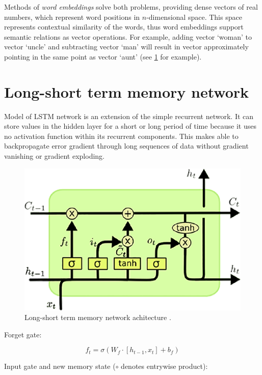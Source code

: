 Methods of \emph{word embeddings} solve both problems, providing dense vectors of real numbers, which represent word positions in $n$-dimensional space. This space represents contextual similarity of the words, thus word embeddings support semantic relations as vector operations. For example, adding vector ‘woman’ to vector ‘uncle’ and subtracting vector ‘man’ will result in vector approximately pointing in the same point as vector ‘aunt’ (see \ref{fig:word_embeddings} for example).

\section{Long-short term memory network}
Model of LSTM network is an extension of the simple recurrent network. It can store values in the hidden layer for a short or long period of time because it uses no activation function within its recurrent components. This makes able to backpropagate error gradient through long sequences of data without gradient vanishing or gradient exploding.

\begin{figure}
\centering
\includegraphics{Figures/lstm}
\decoRule
\caption[Long-short term memory]{Long-short term memory network achitecture \parencite{lstm-picture}.}
\label{fig:word_embeddings}
\end{figure}

Forget gate:

\begin{equation}
f_t = \sigma(W_f\cdot[h_{t-1},x_t] + b_f)
\label{lstm:ft}
\end{equation} 

Input gate and new memory state ($\circ$ denotes entrywise product):

